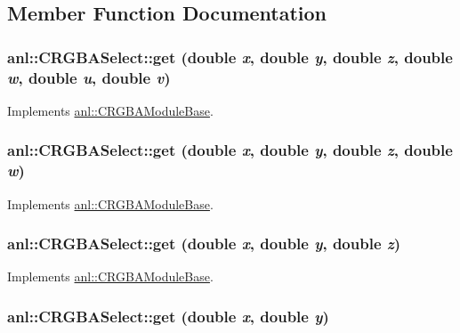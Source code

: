 \subsection{Member Function Documentation}
\hypertarget{classanl_1_1CRGBASelect_ab01b30f5f625045abec088065028a11c}{
\subsubsection[{get}]{ anl::CRGBASelect::get (double {\em x}, \/  double {\em y}, \/  double {\em z}, \/  double {\em w}, \/  double {\em u}, \/  double {\em v})}}
\label{classanl_1_1CRGBASelect_ab01b30f5f625045abec088065028a11c}


Implements \hyperlink{classanl_1_1CRGBAModuleBase_aa5a0b719101302596a697aa8c2292f55}{anl::CRGBAModuleBase}.\hypertarget{classanl_1_1CRGBASelect_a4822cca441faee7e42bc6f308498ccbb}{
\subsubsection[{get}]{ anl::CRGBASelect::get (double {\em x}, \/  double {\em y}, \/  double {\em z}, \/  double {\em w})}}
\label{classanl_1_1CRGBASelect_a4822cca441faee7e42bc6f308498ccbb}


Implements \hyperlink{classanl_1_1CRGBAModuleBase_ab94523074ef298bb99f0830051e78c1c}{anl::CRGBAModuleBase}.\hypertarget{classanl_1_1CRGBASelect_acc89668e15e5db0f377a8c35e920a223}{
\subsubsection[{get}]{ anl::CRGBASelect::get (double {\em x}, \/  double {\em y}, \/  double {\em z})}}
\label{classanl_1_1CRGBASelect_acc89668e15e5db0f377a8c35e920a223}


Implements \hyperlink{classanl_1_1CRGBAModuleBase_a097897c2d625c824832325260169c90e}{anl::CRGBAModuleBase}.\hypertarget{classanl_1_1CRGBASelect_a43f0fe9cb33e1dab8488c2413337900d}{
\subsubsection[{get}]{ anl::CRGBASelect::get (double {\em x}, \/  double {\em y})}}
\label{classanl_1_1CRGBASelect_a43f0fe9cb33e1dab8488c2413337900d}


